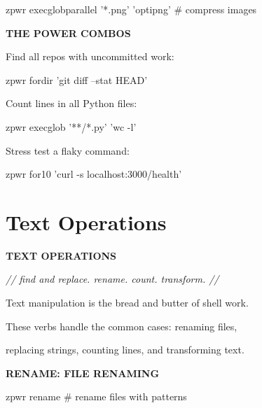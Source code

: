 \documentclass[11pt,a4paper,twoside]{book}
\begin{document}
\begin{codebox}
zpwr execglobparallel '*.png' 'optipng'  \# compress images\\
\end{codebox}


\vspace{12pt}
{\bfseries\color{neonyellow} THE POWER COMBOS}\vspace{4pt}

Find all repos with uncommitted work:

\begin{codebox}
zpwr fordir 'git diff --stat HEAD'\\
\end{codebox}

Count lines in all Python files:

\begin{codebox}
zpwr execglob '**/*.py' 'wc -l'\\
\end{codebox}

Stress test a flaky command:

\begin{codebox}
zpwr for10 'curl -s localhost:3000/health'\\
\end{codebox}


\vspace{16pt}

\section{Text Operations}


\vspace{10pt}
{\large\bfseries\color{neoncyan} TEXT OPERATIONS}\vspace{6pt}

{\small\itshape\color{dimtext} // find and replace. rename. count. transform. //}

Text manipulation is the bread and butter of shell work.

These verbs handle the common cases: renaming files,

replacing strings, counting lines, and transforming text.


\vspace{12pt}
{\bfseries\color{neonyellow} RENAME: FILE RENAMING}\vspace{4pt}

\begin{codebox}
zpwr rename                         \# rename files with patterns\\
\end{codebox}
\end{document}
